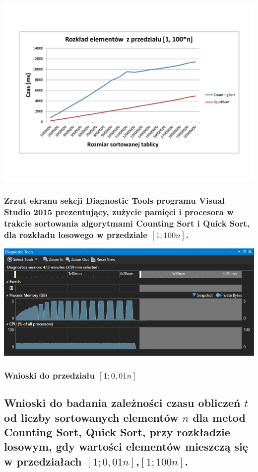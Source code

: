 \documentclass[polish,polish,a4paper]{article}
\begin{document}
\begin{spacing}{1.5}
\begin{minipage}[H]{\textwidth}
	\begin{center}
		\includegraphics[scale=0.6]{zad4100n.pdf}
		\label{fig:zad4100n}
	\end{center}
\end{minipage}

\subsubsection*{Zrzut ekranu sekcji Diagnostic Tools programu Visual Studio 2015 prezentujący, zużycie pamięci i procesora w trakcie sortowania algorytmami Counting Sort i  Quick Sort, dla rozkładu losowego w przedziale $[1;100n]$.}

\begin{minipage}[H]{\textwidth}
	\begin{center}
		\includegraphics[scale=0.85]{zad4pamiec100n.png}
		\label{fig:zad4pamiec100n}
	\end{center}
\end{minipage}

\subsubsection{Wnioski do przedziału $[1;0,01n]$}


\subsection{Wnioski do badania zależności czasu obliczeń $t$ od liczby sortowanych elementów $n$ dla metod Counting Sort, Quick Sort, przy rozkładzie losowym, gdy wartości elementów mieszczą się w przedziałach  $ [1;0,01n] $,$ [1;100n] $. }
	

	
\end{spacing}
	\newpage
	\tableofcontents
\end{document}
